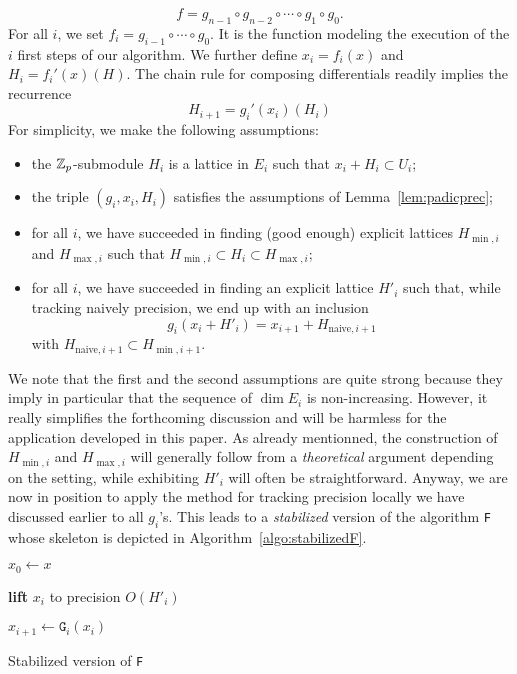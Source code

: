\documentclass{article}
\begin{document}
$$f = g_{n-1} \circ g_{n-2} \circ \cdots \circ g_1 \circ g_0.$$
For all $i$, we set $f_i = g_{i-1} \circ \cdots \circ g_0$. It is the 
function modeling the execution of the $i$ first steps of our algorithm. 
We further define $x_i = f_i(x)$ and $H_i = f_i'(x)(H)$. The chain rule 
for composing differentials readily implies the recurrence
\begin{equation}
\label{eq:giprime}
H_{i+1} = g_i'(x_i)(H_i)
\end{equation}
For simplicity, we make the following assumptions:
\begin{itemize}
\item the $\mathbb Z_p$-submodule $H_i$ is a lattice in $E_i$ such that $x_i + 
H_i \subset U_i$;
\item the triple $(g_i, x_i, H_i)$ satisfies the assumptions of 
Lemma~\ref{lem:padicprec};
\item for all $i$, we have succeeded in finding (good enough) explicit 
lattices $H_{\min,i}$ and $H_{\max,i}$ such that $H_{\min,i} \subset H_i 
\subset H_{\max,i}$;
\item for all $i$, we have succeeded in finding an explicit lattice
$H'_i$ such that, while tracking naively precision, we end up with an
inclusion
$$g_i(x_i + H'_i) = x_{i+1} + H_{\text{naive},i+1}$$
with $H_{\text{naive},i+1} \subset H_{\min,i+1}$.
\end{itemize}
We note that the first and the second assumptions are quite strong 
because they imply in particular that the sequence of $\dim E_i$ is 
non-increasing. However, it really simplifies the forthcoming discussion 
and will be harmless for the application developed in this paper. As
already mentionned, the construction of $H_{\min,i}$ and $H_{\max,i}$
will generally follow from a \emph{theoretical} argument depending on
the setting, while exhibiting $H'_i$ will often be straightforward.
Anyway, we are now in position to apply the method for 
tracking precision locally we have discussed earlier to all $g_i$'s. 
This leads to a \emph{stabilized} version of the algorithm \texttt{F} 
whose skeleton is depicted in Algorithm~\ref{algo:stabilizedF}.

\begin{algorithm}
  
  \BlankLine

  $x_0 \leftarrow x$

    {\textbf{lift} $x_i$ to precision $O(H'_i)$

     $x_{i+1} \leftarrow \texttt{G}_i(x_i)$}

\caption{Stabilized version of \texttt{F}}
\label{algo:stabilizedF}
\end{algorithm}
\end{document}
